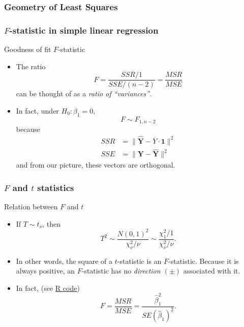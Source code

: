 \documentclass[handout]{beamer}
\begin{document}

   \begin{frame} \frametitle{Geometry of Least Squares}

   \end{frame}


   \begin{frame} \frametitle{$F$-statistic in simple linear regression}

   \begin{block}
   {Goodness of fit $F$-statistic}
   \begin{itemize}
   \item The ratio $$
   F=\frac{SSR/1}{SSE/(n-2)} = \frac{MSR}{MSE}$$
   can be thought of as a {\em ratio of ``variances''}.

   \item In fact, under $H_0:\beta_1=0$, $$
   F \sim F_{1, n-2}
   $$
   because
   $$
   \begin{aligned}
   SSR &= \|\widehat{\pmb{Y}} - \overline{Y} \cdot \pmb{1}\|^2 \\
   SSE &= \|\pmb{Y} - \widehat{\pmb{Y}}\|^2
   \end{aligned}
   $$
   and from our picture, these vectors are orthogonal.
   \end{itemize}
   \end{block}
   \end{frame}


   \begin{frame} \frametitle{$F$ and $t$ statistics}

   \begin{block}
   {Relation between $F$ and $t$}
   \begin{itemize}
   \item If $T \sim t_{\nu}$, then
   $$
   T^2 \sim \frac{N(0,1)^2}{\chi^2_{\nu}/\nu} \sim \frac{\chi^2_1/1}{\chi^2_{\nu}/\nu}.$$

   \item In other words, the square of a $t$-statistic is an $F$-statistic.
   Because it is always positive, an $F$-statistic has no {\em direction $(\pm)$} associated with it.


   \item In fact, (see \href{http://stats191.stanford.edu/simple_diagnostics.html#poorly-fitting-linear-model}{R code})
   $$
   F = \frac{MSR}{MSE} = \frac{\widehat{\beta}_1^2}{SE(\widehat{\beta}_1)^2}.$$

   \end{itemize}
   \end{block}
   \end{frame}
\end{document}

